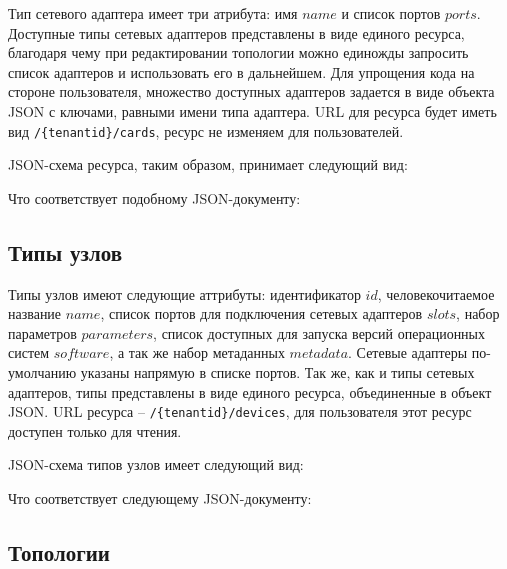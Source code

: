 Тип сетевого адаптера имеет три атрибута: имя $name$ и список портов $ports$. 
Доступные типы сетевых адаптеров представлены
в виде единого ресурса, благодаря чему при редактировании топологии можно единожды
запросить список адаптеров и использовать его в дальнейшем.  Для упрощения кода на стороне 
пользователя, множество доступных адаптеров задается в виде объекта JSON с ключами,
равными имени типа адаптера. URL для ресурса будет иметь вид \verb`/{tenantid}/cards`, ресурс не изменяем
для пользователей. 

JSON-схема ресурса, таким образом, принимает следующий вид:



Что соответствует подобному JSON-документу:




\subsection{Типы узлов}

Типы узлов имеют следующие аттрибуты: идентификатор $id$, человекочитаемое название
$name$, список портов для подключения сетевых адаптеров $slots$, 
набор параметров $parameters$, список доступных для запуска версий операционных систем 
$software$, а так же набор метаданных $metadata$. Сетевые адаптеры
по-умолчанию указаны напрямую в списке портов.
Так же, как и типы сетевых адаптеров, типы представлены в виде единого ресурса, объединенные в 
объект JSON. URL ресурса -- \verb`/{tenantid}/devices`, для пользователя этот ресурс доступен только 
для чтения.

JSON-схема типов узлов имеет следующий вид:



Что соответствует следующему JSON-документу:




\subsection{Топологии}



